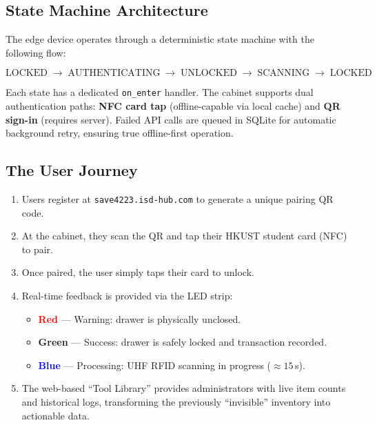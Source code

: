 \documentclass[12pt, a4paper]{article}
\begin{document}
\subsection{State Machine Architecture}

The edge device operates through a deterministic state machine with the following flow:

\[
  \text{LOCKED} \;\rightarrow\; \text{AUTHENTICATING} \;\rightarrow\; \text{UNLOCKED} \;\rightarrow\; \text{SCANNING} \;\rightarrow\; \text{LOCKED}
\]

Each state has a dedicated \texttt{on\_enter} handler.
The cabinet supports dual authentication paths: \textbf{NFC card tap} (offline-capable via local cache) and \textbf{QR sign-in} (requires server).
Failed API calls are queued in SQLite for automatic background retry, ensuring true offline-first operation.

\subsection{The User Journey}

\begin{enumerate}[nosep]
  \item Users register at \texttt{save4223.isd-hub.com} to generate a unique pairing QR code.
  \item At the cabinet, they scan the QR and tap their HKUST student card (NFC) to pair.
  \item Once paired, the user simply taps their card to unlock.
  \item Real-time feedback is provided via the LED strip:
    \begin{itemize}[nosep]
      \item \textcolor{red}{\textbf{Red}} --- Warning: drawer is physically unclosed.
      \item \textcolor{green!60!black}{\textbf{Green}} --- Success: drawer is safely locked and transaction recorded.
      \item \textcolor{blue}{\textbf{Blue}} --- Processing: UHF RFID scanning in progress ($\approx 15$\,s).
    \end{itemize}
  \item The web-based ``Tool Library'' provides administrators with live item counts and historical logs, transforming the previously ``invisible'' inventory into actionable data.
\end{enumerate}

\end{document}

